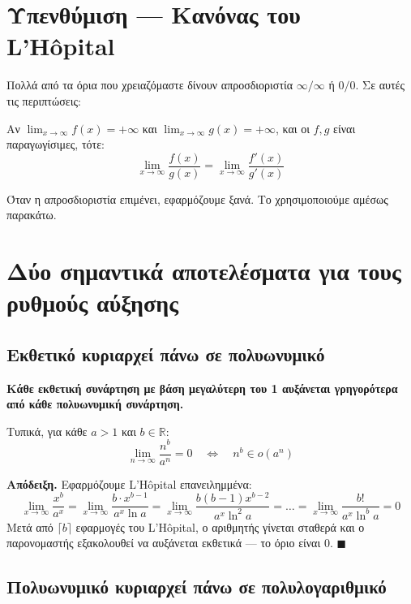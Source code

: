 \documentclass[11pt,a4paper]{article}
\begin{document}
\section{Υπενθύμιση --- Κανόνας του L'Hôpital}

Πολλά από τα όρια που χρειαζόμαστε δίνουν απροσδιοριστία $\infty/\infty$ ή $0/0$.
Σε αυτές τις περιπτώσεις:

\begin{quoteblock}
Αν $\lim_{x \to \infty} f(x) = +\infty$ και $\lim_{x \to \infty} g(x) = +\infty$,
και οι $f, g$ είναι παραγωγίσιμες, τότε:
\[
\lim_{x \to \infty} \frac{f(x)}{g(x)} = \lim_{x \to \infty} \frac{f'(x)}{g'(x)}
\]
\end{quoteblock}

Όταν η απροσδιοριστία επιμένει, εφαρμόζουμε ξανά. Το χρησιμοποιούμε αμέσως
παρακάτω.

\section{Δύο σημαντικά αποτελέσματα για τους ρυθμούς αύξησης}

\subsection{Εκθετικό κυριαρχεί πάνω σε πολυωνυμικό}

\begin{quoteblock}
\textbf{Κάθε εκθετική συνάρτηση με βάση μεγαλύτερη του 1 αυξάνεται γρηγορότερα από
κάθε πολυωνυμική συνάρτηση.}
\end{quoteblock}

Τυπικά, για κάθε $a > 1$ και $b \in \mathbb{R}$:
\[
\lim_{n \to \infty} \frac{n^b}{a^n} = 0 \quad \Leftrightarrow \quad n^b \in o(a^n)
\]

\begin{examplebox}
\textbf{Απόδειξη.} Εφαρμόζουμε L'Hôpital επανειλημμένα:
\[
\lim_{x \to \infty} \frac{x^b}{a^x}
= \lim_{x \to \infty} \frac{b \cdot x^{b-1}}{a^x \ln a}
= \lim_{x \to \infty} \frac{b(b-1) x^{b-2}}{a^x \ln^2 a}
= \dots
= \lim_{x \to \infty} \frac{b!}{a^x \ln^b a} = 0
\]
Μετά από $\lceil b \rceil$ εφαρμογές του L'Hôpital, ο αριθμητής γίνεται σταθερά
και ο παρονομαστής εξακολουθεί να αυξάνεται εκθετικά --- το όριο είναι $0$.
$\blacksquare$
\end{examplebox}

\subsection{Πολυωνυμικό κυριαρχεί πάνω σε πολυλογαριθμικό}
\end{document}
